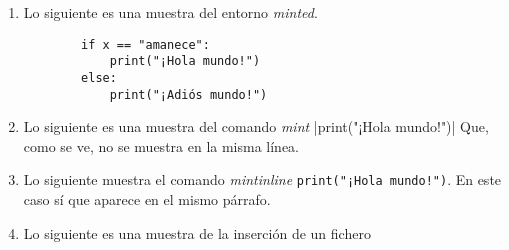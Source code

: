 \documentclass{article}
\begin{document}
	\begin{enumerate}
	\item Lo siguiente es una muestra del entorno \emph{minted}.
	\begin{verbatim}
		if x == "amanece":
			print("¡Hola mundo!")
		else:
			print("¡Adiós mundo!")
	\end{verbatim}
	
	\item Lo siguiente es una muestra del comando \emph{mint} |print("¡Hola mundo!")| Que, como se ve, no se muestra en la misma línea.

	\item Lo siguiente muestra el comando \emph{mintinline} \texttt{print("¡Hola mundo!")}. En este caso sí que aparece en el mismo párrafo.
	
	\item Lo siguiente es una muestra de la inserción de un fichero
	
	\end{enumerate}
	
\end{document}

